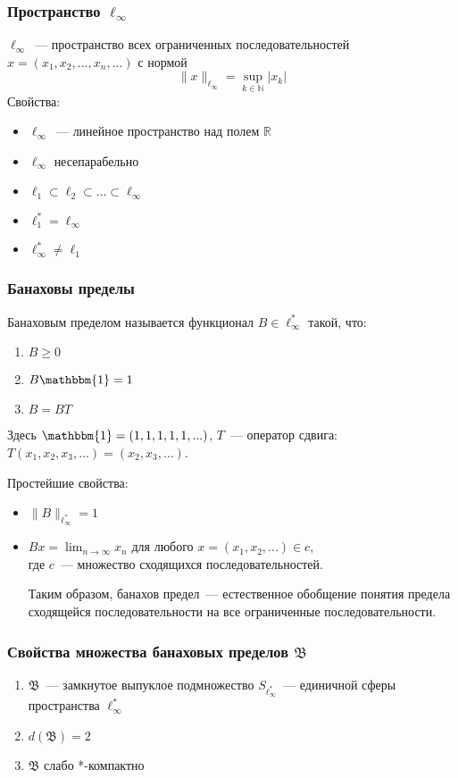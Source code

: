 \documentclass[10pt,pdf,hyperref={unicode},aspectratio=169,color={usenames, dvipsnames}]{beamer}\usepackage{amsmath}
\theoremstyle{definition}
\begin{document}
\begin{frame}\frametitle{Пространство $\ell_\infty$}
	$\ell_\infty$~--- пространство всех ограниченных последовательностей
	$x=(x_1, x_2, ..., x_n, ...)$
	с нормой
	$$
		\|x\|_{\ell_\infty} = \sup_{k\in\mathbb{N}} |x_k|
	$$
	{Свойства:}

	\begin{itemize}
		\item
			$\ell_\infty$~--- линейное пространство над полем $\mathbb{R}$
		\item
			$\ell_\infty$  несепарабельно
		\item
			$\ell_1 \subset \ell_2 \subset \dots \subset \ell_\infty$
		\item
			$\ell_1^* = \ell_\infty$
		\item
			$\ell_\infty^* \neq \ell_1$
	\end{itemize}
\end{frame}

\begin{frame}\frametitle{Банаховы пределы}
	Банаховым пределом называется функционал $B\in \ell_\infty^*$ такой, что:
	\begin{enumerate}
		\item
			$B \geqslant 0$
		\item
			$B\mathbbm{1} = 1$
		\item
			$B=BT$
	\end{enumerate}
	Здесь $\mathbbm{1}=(1,1,1,1,1,...)$,
	$T$~--- оператор сдвига: $T(x_1, x_2, x_3, ...) = (x_2, x_3, ...)$.

	Простейшие свойства:
	\begin{itemize}
		\item
			$\|B\|_{\ell_\infty^*} = 1$
		\item
			$Bx = \lim_{n\to\infty} x_n$ для любого $x=(x_1, x_2, ...) \in c$,
			\\
			где $c$~--- множество сходящихся последовательностей.

			Таким образом,
			банахов предел~--- естественное обобщение понятия предела сходящейся последовательности
			на все ограниченные последовательности.
	\end{itemize}
\end{frame}

\begin{frame}\frametitle{Свойства множества банаховых пределов $\mathfrak{B}$}
	\begin{enumerate}
		\item
			$\mathfrak{B}$~--- замкнутое выпуклое подмножество $ S_{\ell_\infty^*}$~---
			единичной сферы пространства $\ell_\infty^*$
		\item
			$d(\mathfrak{B}) = 2$
		\item
			$\mathfrak{B}$ слабо *-компактно
	\end{enumerate}
\end{frame}
\end{document}
